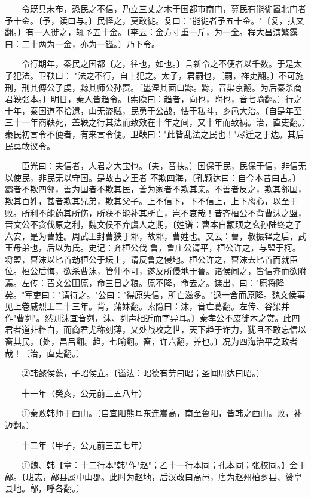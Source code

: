　　令既具未布，恐民之不信，乃立三丈之木于国都巿南门，募民有能徙置北门者予十金。〔予，读曰与。〕民怪之，莫敢徙。复曰："能徙者予五十金。"〔复，扶又翻。〕有一人徙之，辄予五十金。〔李云：金方寸重一斤，为一金。程大昌演繁露曰：二十两为一金，亦为一镒。〕乃下令。

　　令行期年，秦民之国都〔之，往也，如也。〕言新令之不便者以千数。于是太子犯法。卫鞅曰： "法之不行，自上犯之。太子，君嗣也，〔嗣，祥吏翻。〕不可施刑，刑其傅公子虔，黥其师公孙贾。〔墨涅其面曰黥。黥，音渠京翻。为后秦杀商君鞅张本。〕明日，秦人皆趋令。〔索隐曰：趋者，向也，附也，音七喻翻。〕行之十年，秦国道不拾遗，山无盗贼，民勇于公战，怯于私斗，乡邑大治。〔自是年至三十一年商鞅死，盖鞅之行其法而致效在十年之间，又十年而致祸。治，直吏翻。〕秦民初言令不便者，有来言令便。卫鞅曰："此皆乱法之民也！"尽迁之于边。其后民莫敢议令。

　　臣光曰：夫信者，人君之大宝也。〔夫，音扶。〕国保于民，民保于信，非信无以使民，非民无以守国。是故古之王者 不欺四海，〔孔颖达曰：自今本昔曰古。〕霸者不欺四邻，善为国者不欺其民，善为家者不欺其亲。不善者反之，欺其邻国，欺其百姓，甚者欺其兄弟，欺其父子。上不信下，下不信上，上下离心，以至于败。所利不能药其所伤，所获不能补其所亡，岂不哀哉！昔齐桓公不背曹沫之盟，晋文公不贪伐原之利，魏文侯不弃虞人之期，〔姓谱：曹本自颛顼之玄孙陆终之子六安，是为曹姓。周武王封曹狭于邾，故邾，曹姓也。又云：曹，叔振铎之后，武王母弟也，后以为氏。史记：齐桓公伐 鲁，鲁庄公请平，桓公许之，与盟于柯。将盟，曹沫以匕首劫桓公于坛上，请反鲁之侵地。桓公许之，曹沫去匕首而就臣位。桓公后悔，欲杀曹沫，管仲不可，遂反所侵地于鲁。诸侯闻之，皆信齐而欲附焉。左传：晋文公围原，命三日之粮。原不降，命去之。谍出，曰："原将降矣。"军吏曰："请待之。"公曰："得原失信，所亡滋多。"退一舍而原降。魏文侯事见上卷威烈王二十三年。背，蒲妹翻。索隐曰：沫，音亡葛翻。左传、谷梁并作"曹刿"。然则沫宜音刿，沫、刿声相近而字异耳。〕秦孝公不废徙木之赏。此四君者道非粹白，而商君尤称刻薄，又处战攻之世，天下趋于诈力，犹且不敢忘信以畜其民，〔处，昌吕翻。趋，七喻翻。畜，许六翻，养也。〕况为四海治平之政者哉！〔治，直吏翻。〕

　　②韩懿侯薨，子昭侯立。〔谥法：昭德有劳曰昭；圣闻周达曰昭。〕

　　十一年（癸亥，公元前三五八年）

　　①秦败韩师于西山。〔自宜阳熊耳东连嵩高，南至鲁阳，皆韩之西山。败，补迈翻。〕

　　十二年（甲子，公元前三五七年）

　　①魏、韩【章：十二行本"韩"作"赵"；乙十一行本同；孔本同；张校同。】会于鄗。〔班志，鄗县属中山郡。此时为赵地，后汉改曰高邑，唐为赵州柏乡县、赞皇县地。鄗，呼各翻。〕

